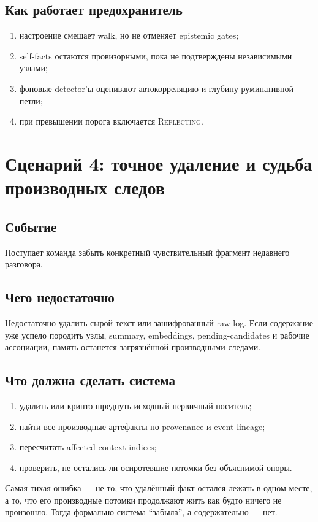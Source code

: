\subsection*{Как работает предохранитель}
\begin{enumerate}
\item настроение смещает walk, но не отменяет epistemic gates;
\item self-facts остаются провизорными, пока не подтверждены независимыми узлами;
\item фоновые detector'ы оценивают автокорреляцию и глубину руминативной петли;
\item при превышении порога включается \textsc{Reflecting}.
\end{enumerate}

\section{Сценарий 4: точное удаление и судьба производных следов}

\subsection*{Событие}
Поступает команда забыть конкретный чувствительный фрагмент недавнего разговора.

\subsection*{Чего недостаточно}
Недостаточно удалить сырой текст или зашифрованный raw-log. Если содержание уже
успело породить узлы, summary, embeddings, pending-candidates и рабочие ассоциации,
память останется загрязнённой производными следами.

\subsection*{Что должна сделать система}
\begin{enumerate}
\item удалить или крипто-шреднуть исходный первичный носитель;
\item найти все производные артефакты по provenance и event lineage;
\item пересчитать affected context indices;
\item проверить, не остались ли осиротевшие потомки без объяснимой опоры.
\end{enumerate}

\begin{pitfall}
Самая тихая ошибка — не то, что удалённый факт остался лежать в одном месте, а то,
что его производные потомки продолжают жить как будто ничего не произошло. Тогда
формально система ``забыла'', а содержательно — нет.
\end{pitfall}

